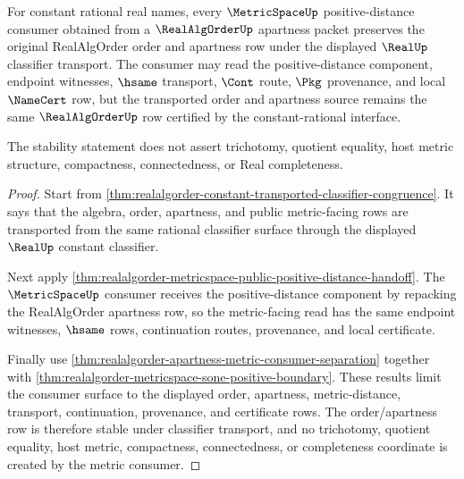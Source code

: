 \begin{theorem}
\label{thm:realalgorder-metric-consumer-order-stability}
For constant rational real names, every $\MetricSpaceUp$ positive-distance
consumer obtained from a $\RealAlgOrderUp$ apartness packet preserves the
original RealAlgOrder order and apartness row under the displayed $\RealUp$
classifier transport. The consumer may read the positive-distance component,
endpoint witnesses, $\hsame$ transport, $\Cont$ route, $\Pkg$ provenance, and
local $\NameCert$ row, but the transported order and apartness source remains
the same $\RealAlgOrderUp$ row certified by the constant-rational interface.

The stability statement does not assert trichotomy, quotient equality, host
metric structure, compactness, connectedness, or Real completeness.
\end{theorem}
\begin{proof}
Start from
\autoref{thm:realalgorder-constant-transported-classifier-congruence}. It says
that the algebra, order, apartness, and public metric-facing rows are transported
from the same rational classifier surface through the displayed $\RealUp$
constant classifier.

Next apply
\autoref{thm:realalgorder-metricspace-public-positive-distance-handoff}. The
$\MetricSpaceUp$ consumer receives the positive-distance component by repacking
the RealAlgOrder apartness row, so the metric-facing read has the same endpoint
witnesses, $\hsame$ rows, continuation routes, provenance, and local certificate.

Finally use
\autoref{thm:realalgorder-apartness-metric-consumer-separation} together with
\autoref{thm:realalgorder-metricspace-sone-positive-boundary}. These results
limit the consumer surface to the displayed order, apartness, metric-distance,
transport, continuation, provenance, and certificate rows. The order/apartness
row is therefore stable under classifier transport, and no trichotomy, quotient
equality, host metric, compactness, connectedness, or completeness coordinate is
created by the metric consumer.
\end{proof}
